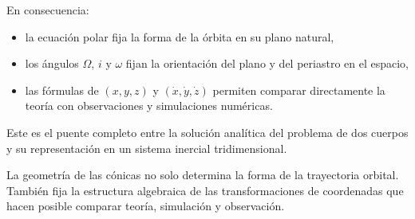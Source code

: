 En consecuencia:
\begin{itemize}
    \item la ecuación polar fija la forma de la órbita en su plano natural,
    \item los ángulos \(\Omega\), \(i\) y \(\omega\) fijan la orientación del plano y del periastro en el espacio,
    \item las fórmulas de \((x,y,z)\) y \((\dot{x},\dot{y},\dot{z})\) permiten comparar directamente la teoría con observaciones y simulaciones numéricas.
\end{itemize}

Este es el puente completo entre la solución analítica del problema de dos cuerpos y su representación en un sistema inercial tridimensional.

\begin{importante}
La geometría de las cónicas no solo determina la forma de la trayectoria orbital. También fija la estructura algebraica de las transformaciones de coordenadas que hacen posible comparar teoría, simulación y observación.
\end{importante}